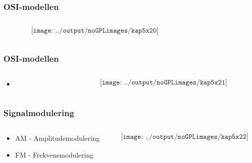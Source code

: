 \documentclass[aspectratio=169,xcolor=dvipsnames]{beamer}
\begin{document}
\begin{frame}
	\frametitle{OSI-modellen}
	\begin{columns}
		\begin{column}{0.5\textwidth}

	$$\texttt{[image: ../output/noGPLimages/kap5x20]}$$

			
		\end{column}

		\begin{column}{0.5\textwidth}
		\end{column}
	\end{columns}
\end{frame}
\begin{frame}
	\frametitle{OSI-modellen}
	\begin{columns}
		\begin{column}{0.5\textwidth}

			\begin{itemize}
				\item 
			\end{itemize}

			
		\end{column}

		\begin{column}{0.5\textwidth}
	$$\texttt{[image: ../output/noGPLimages/kap5x21]}$$
		\end{column}
	\end{columns}
\end{frame}
\begin{frame}
	\frametitle{Signalmodulering}
	\begin{columns}
		\begin{column}{0.5\textwidth}

			\begin{itemize}
				\item AM - Amplitudemodulering
				\item FM - Frekvensmodulering
			\end{itemize}

			
		\end{column}

		\begin{column}{0.5\textwidth}
	$$\texttt{[image: ../output/noGPLimages/kap5x22]}$$
		\end{column}
	\end{columns}
\end{frame}
\end{document}
